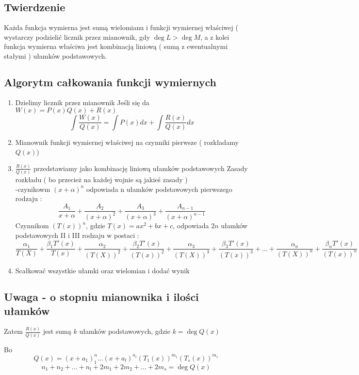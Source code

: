 \documentclass[11pt]{article}
\begin{document}
\subsection{Twierdzenie}
Każda funkcja wymierna jest sumą wielomianu i funkcji wymiernej właściwej ( wystarczy podzielić licznik przez mianownik, gdy $\deg L > \deg M$, a z kolei funkcja wymierna właściwa jest kombinacją liniową ( sumą z ewentualnymi stałymi ) ułamków podstawowych.

\subsection{Algorytm całkowania funkcji wymiernych}
\begin{enumerate}
\item{Dzielimy licznik przez mianownik} 
Jeśli się da $W(x) = P(x)Q(x) + R(x)$
$$\int \frac{W(x)}{Q(x)} = \int P(x) dx + \int \frac{R(x)}{Q(x)}dx $$
\item{Mianownik funkcji wymiernej właściwej na czynniki pierwsze ( rozkładamy $Q(x)$)}
\item{$\frac{R(x)}{Q(x)}$ przedstawiamy jako kombinację liniową ułamków podstawowych}
Zasady rozkładu ( bo przecież na każdej wojnie są jakieś zasady )\\
-czynikowm $(x+\alpha)^n$ odpowiada n ułamków podstawowych pierwszego rodzaju : $$\frac{A_1}{x+\alpha} + \frac{A_2}{(x+\alpha)^2} + \frac{A_3}{(x+\alpha)^3} + \frac{A_{n-1}}{(x+\alpha)^{n-1}}$$
Czynnikom $(T(x))^n$, gdzie $T(x) = ax^2 + bx + c$, odpowiada $2n$ ułamków podstawowych II i III rodzaju w postaci :
$$\frac{\alpha_1}{T(X)} + \frac{\beta_1 T'(x)}{T(x)} + \frac{\alpha_2}{(T(X))^2} + \frac{\beta_2 T'(x)}{(T(x))^2} + \frac{\alpha_3}{(T(X))^3} + \frac{\beta_3 T'(x)}{(T(x))^3} + \ldots + \frac{\alpha_n}{(T(X))^n} + \frac{\beta_n T'(x)}{(T(x))^n}   $$
\item{Scałkować wszystkie ułamki oraz wielomian i dodać wynik}
\end{enumerate}

\subsection{Uwaga - o stopniu mianownika i ilości ułamków}
Zatem $\frac{R(x)}{Q(x)}$ jest sumą $k$ ułamków podstawowych, gdzie $ k = \deg Q(x) $

Bo $$Q(x) = (x+a_1)^n_1 ... (x + a_l)^{n_l}(T_1(x))^{m_1}(T_s(x))^{m_s}  $$
$$ n_1 + n_2 + \ldots + n_l + 2m_1 + 2m_2 + \ldots + 2m_s = \deg Q(x) $$
\end{document}
